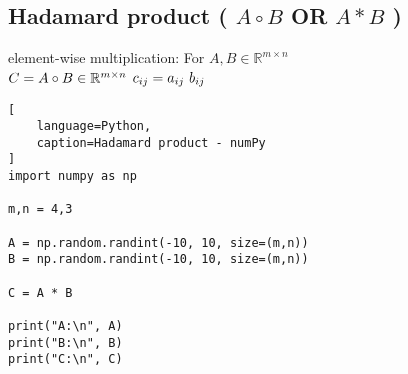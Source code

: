 \subsection{Hadamard product ( $A \circ B$ OR $A \ast B$ ) \cite{mfml/book/mml/Deisenroth-Faisal-Ong}}

element-wise multiplication: For $A,B \in \mathbb{R}^{m\times n}$
\\
$
\hfill
    C = A \circ B \in \mathbb{R}^{m\times n}
$
\hfill
$
    c_{ij} = a_{ij}\ b_{ij}
\hfill
$













\begin{lstlisting}[
    language=Python,
    caption=Hadamard product - numPy
]
import numpy as np

m,n = 4,3

A = np.random.randint(-10, 10, size=(m,n))
B = np.random.randint(-10, 10, size=(m,n))

C = A * B

print("A:\n", A)
print("B:\n", B)
print("C:\n", C)
\end{lstlisting}










